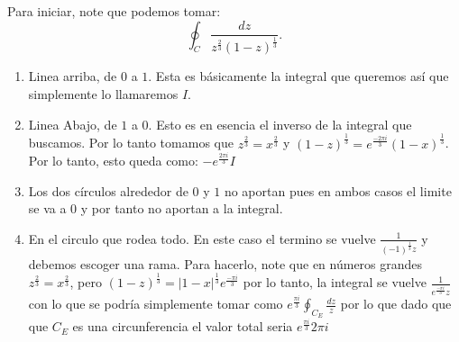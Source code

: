 \documentclass{report}
\begin{document}

Para iniciar, note que podemos tomar: \[
  \oint_{C} \frac{dz}{z^{\frac{2}{3}}\left( 1 - z \right)^{\frac{1}{3}}} 
.\] 
\begin{enumerate}
  \item Linea arriba, de $0$ a $1$. Esta es básicamente la integral que queremos así que simplemente lo llamaremos $I$.
  \item Linea Abajo, de $1$ a $0$. Esto es en esencia el inverso de la integral que buscamos. Por lo tanto tomamos que $z^{\frac{2}{3}}= x^{\frac{2}{3}}$ y $\left( 1 - z \right)^{\frac{1}{3}} = e^{\frac{-2\pi i}{3}}\left( 1 - x \right)^{\frac{1}{3}}$. Por lo tanto, esto queda como: $-e^{\frac{2\pi i}{3}}I$
  \item Los dos círculos alrededor de $0$ y $1$ no aportan pues en ambos casos el limite se va a 0 y por tanto no aportan a la integral.
  \item En el circulo que rodea todo. En este caso el termino se vuelve $\frac{1}{\left( -1 \right)^{\frac{1}{3}}z}$ y debemos escoger una rama. Para hacerlo, note que en números grandes $z^{\frac{2}{3}} = x^{\frac{2}{3}}$, pero $\left( 1 - z \right)^{\frac{1}{3}} = \left| 1 - x \right|^{\frac{1}{3}}e^{\frac{-\pi i }{3}}$ por lo tanto, la integral se vuelve $\frac{1}{e^{\frac{-\pi i}{3}}z}$ con lo que se podría simplemente tomar como $e^{\frac{\pi i}{3}} \oint_{C_E} \frac{dz}{z} $ por lo que dado que que $C_E$ es una circunferencia el valor total seria $e^{\frac{\pi i}{3}}2\pi i$
\end{enumerate}
\end{document}

